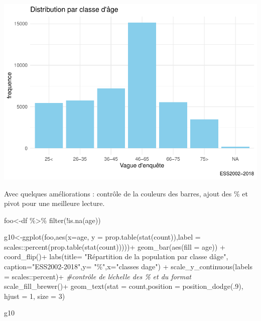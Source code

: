 \documentclass[
]{book}
\newenvironment{Shaded}{\begin{snugshade}}{\end{snugshade}}
\newcommand{\AttributeTok}[1]{\textcolor[rgb]{0.77,0.63,0.00}{#1}}
\newcommand{\CommentTok}[1]{\textcolor[rgb]{0.56,0.35,0.01}{\textit{#1}}}
\newcommand{\DecValTok}[1]{\textcolor[rgb]{0.00,0.00,0.81}{#1}}
\newcommand{\FunctionTok}[1]{\textcolor[rgb]{0.00,0.00,0.00}{#1}}
\newcommand{\NormalTok}[1]{#1}
\newcommand{\OtherTok}[1]{\textcolor[rgb]{0.56,0.35,0.01}{#1}}
\newcommand{\SpecialCharTok}[1]{\textcolor[rgb]{0.00,0.00,0.00}{#1}}
\newcommand{\StringTok}[1]{\textcolor[rgb]{0.31,0.60,0.02}{#1}}
\begin{document}
\includegraphics{bookdown-demo_files/figure-latex/308-1.pdf}

Avec quelques améliorations : contrôle de la couleurs des barres, ajout des \% et pivot pour une meilleure lecture.

\begin{Shaded}
\begin{Highlighting}[]
\NormalTok{foo}\OtherTok{\textless{}{-}}\NormalTok{df }\SpecialCharTok{\%\textgreater{}\%}
  \FunctionTok{filter}\NormalTok{(}\SpecialCharTok{!}\FunctionTok{is.na}\NormalTok{(age))}

\NormalTok{g10}\OtherTok{\textless{}{-}}\FunctionTok{ggplot}\NormalTok{(foo,}\FunctionTok{aes}\NormalTok{(}\AttributeTok{x=}\NormalTok{age, }\AttributeTok{y =} \FunctionTok{prop.table}\NormalTok{(}\FunctionTok{stat}\NormalTok{(count)),}\AttributeTok{label =}\NormalTok{ scales}\SpecialCharTok{::}\FunctionTok{percent}\NormalTok{(}\FunctionTok{prop.table}\NormalTok{(}\FunctionTok{stat}\NormalTok{(count)))))}\SpecialCharTok{+}
  \FunctionTok{geom\_bar}\NormalTok{(}\FunctionTok{aes}\NormalTok{(}\AttributeTok{fill =}\NormalTok{ age)) }\SpecialCharTok{+}  
  \FunctionTok{coord\_flip}\NormalTok{()}\SpecialCharTok{+} 
  \FunctionTok{labs}\NormalTok{(}\AttributeTok{title=} \StringTok{"Répartition de la population par classe d\textquotesingle{}âge"}\NormalTok{, }\AttributeTok{caption=}\StringTok{"ESS2002{-}2018"}\NormalTok{,}\AttributeTok{y=} \StringTok{"\%"}\NormalTok{,}\AttributeTok{x=}\StringTok{"classes d\textquotesingle{}age"}\NormalTok{) }\SpecialCharTok{+}
  \FunctionTok{scale\_y\_continuous}\NormalTok{(}\AttributeTok{labels =}\NormalTok{ scales}\SpecialCharTok{::}\NormalTok{percent)}\SpecialCharTok{+} \CommentTok{\#contrôle de l\textquotesingle{}échelle des \% et du format}
  \FunctionTok{scale\_fill\_brewer}\NormalTok{()}\SpecialCharTok{+}
  \FunctionTok{geom\_text}\NormalTok{(}\AttributeTok{stat =} \StringTok{\textquotesingle{}count\textquotesingle{}}\NormalTok{,}\AttributeTok{position =} \FunctionTok{position\_dodge}\NormalTok{(.}\DecValTok{9}\NormalTok{),  }\AttributeTok{hjust =} \DecValTok{1}\NormalTok{, }\AttributeTok{size =} \DecValTok{3}\NormalTok{)}


\NormalTok{g10}
\end{Highlighting}
\end{Shaded}
\end{document}
